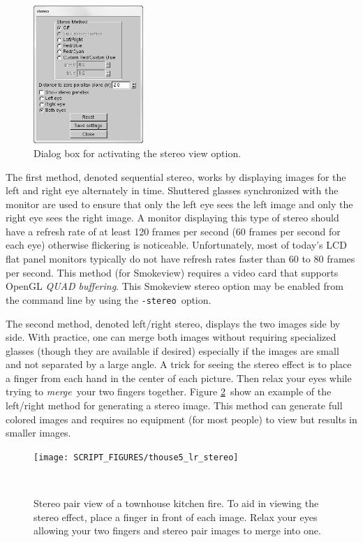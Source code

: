 \documentclass[11pt,twoside]{book}
\begin{document}
\begin{figure}[bph]
\begin{center}
\includegraphics[height=2.055555in]{FIGURES/figSTEREO}
\caption{Dialog box for activating the stereo view option.}
\label{figstereodialog}
\end{center}
\end{figure}

The first method, denoted sequential stereo, works by displaying
images for the left and right eye alternately in time.  Shuttered
glasses  synchronized with the monitor are used to ensure that
only the left eye sees the left image and only the right eye sees
the right image.  A monitor displaying this type of stereo should
have a refresh rate of at least 120 frames per second (60 frames
per second for each eye) otherwise flickering is noticeable.
Unfortunately, most of today's LCD flat panel monitors typically
do not have refresh rates faster than 60 to 80 frames per second.
This method (for Smokeview) requires a video card that supports
OpenGL {\em QUAD buffering}. This Smokeview stereo option may be
enabled from the command line by using the {\tt -stereo}\ option.

The second method, denoted left/right stereo, displays the two
images side by side.  With practice, one can merge both images
without requiring specialized glasses (though they are available
if desired) especially if the images are small and not separated
by a large angle. A trick for seeing the stereo effect is to place
a finger from each hand in the center of each picture.  Then relax
your eyes while trying to {\em merge}\ your two fingers together.
Figure \ref{figlrstereo}\ show an example of the left/right method
for generating a stereo image.  This method can generate full
colored images and requires no equipment (for most people) to view
but results in smaller images.
\begin{figure}[bph]
\begin{center}
\texttt{[image: SCRIPT\_FIGURES/thouse5\_lr\_stereo]}
\caption[Stereo pair view of a townhouse kitchen fire.]{ Stereo
pair view of a townhouse kitchen fire. To aid in viewing the
stereo effect, place a finger in front of each image.  Relax your
eyes allowing your two fingers and stereo pair images to merge
into one. }\ \label{figlrstereo}
\end{center}
\end{figure}
\end{document}
